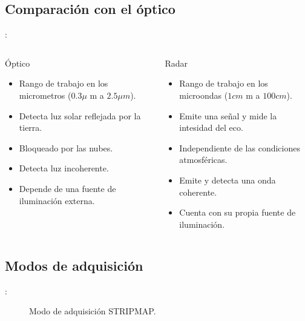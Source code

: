 \subsection{Comparación con el óptico}
\begin{frame}{\secname : \subsecname}
\begin{columns}
  \begin{column}{0.5\textwidth}
   \begin{block}{Óptico}
     \begin{itemize}
       \item Rango de trabajo en los micrometros ($0.3\mu$ m a $2.5\mu m$).
       \item Detecta luz solar reflejada por la tierra.
       \item Bloqueado por las nubes.
       \item Detecta luz incoherente.
       \item Depende de una fuente de iluminación externa.
     \end{itemize}
   \end{block}
  \end{column}
  \begin{column}{0.5\textwidth}  %
    \begin{block}{Radar}
      \begin{itemize}
        \item Rango de trabajo en los microondas ($1cm$ m a $100cm$).
        \item Emite una señal y mide la intesidad del eco.
        \item Independiente de las condiciones atmosféricas.
        \item Emite y detecta una onda coherente.
        \item Cuenta con su propia fuente de iluminación.
      \end{itemize}
    \end{block}
  \end{column}
  \end{columns}
\end{frame}

\subsection{Modos de adquisición}
\begin{frame}{\secname : \subsecname}
  \begin{figure}
    \centering
    \caption{Modo de adquisición STRIPMAP.}
    \label{}
  \end{figure}
\end{frame}

